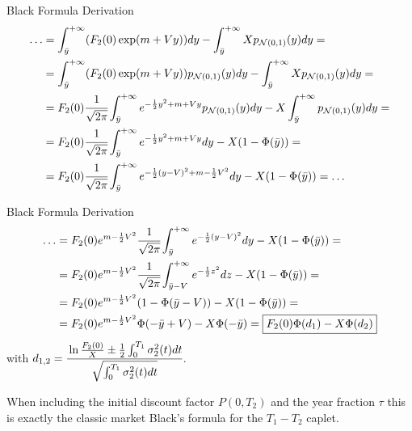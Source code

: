 \documentclass{beamer}
\begin{document}
\begin{frame}{Black Formula Derivation}
\begin{equation*}
\begin{aligned}
\ldots &= 
\int_{\bar{y}}^{+\infty}(F_2(0)\exp(m+Vy))dy - \int_{\bar{y}}^{+\infty}X p_{\mathcal{N}(0,1)}(y)dy = \\
&=\int_{\bar{y}}^{+\infty}(F_2(0)\exp(m+Vy)) p_{\mathcal{N}(0,1)}(y)dy - \int_{\bar{y}}^{+\infty}X p_{\mathcal{N}(0,1)}(y)dy = \\
&=F_2(0)\cfrac{1}{\sqrt{2\pi}}\int_{\bar{y}}^{+\infty}e^{-\frac{1}{2}y^2+m+Vy} p_{\mathcal{N}(0,1)}(y)dy-X\int_{\bar{y}}^{+\infty}p_{\mathcal{N}(0,1)}(y)dy = \\
&=F_2(0)\cfrac{1}{\sqrt{2\pi}}\int_{\bar{y}}^{+\infty}e^{-\frac{1}{2}y^2+m+Vy}dy-X(1-\Phi(\bar{y})) = \\
&= F_2(0)\cfrac{1}{\sqrt{2\pi}}\int_{\bar{y}}^{+\infty}e^{-\frac{1}{2}(y-V)^2 +m-\frac{1}{2}V^2}dy-X(1-\Phi(\bar{y})) = \ldots\\
\end{aligned}
\end{equation*}
\end{frame}

\begin{frame}{Black Formula Derivation}
	\begin{equation*}
		\begin{aligned}
			\ldots 
&=F_2(0)e^{m-\frac{1}{2}V^2}\cfrac{1}{\sqrt{2\pi}}\int_{\bar{y}}^{+\infty}e^{-\frac{1}{2}(y-V)^2}dy-X(1-\Phi(\bar{y})) =\\
&=F_2(0)e^{m-\frac{1}{2}V^2}\cfrac{1}{\sqrt{2\pi}}\int_{\bar{y}-V}^{+\infty}e^{-\frac{1}{2}z^2}dz-X(1-\Phi(\bar{y})) = \\
&= F_2(0)e^{m-\frac{1}{2}V^2}(1-\Phi(\bar{y}-V))-X(1-\Phi(\bar{y})) = \\
&= F_2(0)e^{m-\frac{1}{2}V^2}\Phi(-\bar{y}+V)-X\Phi(-\bar{y}) = \boxed{F_2(0)\Phi(d_1)-X\Phi(d_2)}
		\end{aligned}
	\end{equation*}
	with $d_{1,2}=\cfrac{\ln\frac{F_2(0)}{X}\pm\frac{1}{2}\int_0^{T_1}\sigma^2_2(t)dt}{\sqrt{\int_0^{T_1}\sigma_2^2(t)dt}}$.
	
	When including the initial discount factor $P(0, T_2)$ and the year fraction $\tau$ this is exactly the classic market Black’s formula for the $T_1 - T_2$ caplet.
\end{frame}
\end{document}
